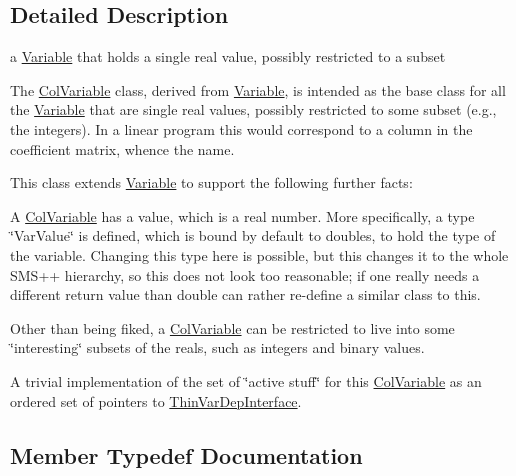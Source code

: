 \subsection{Detailed Description}
a \mbox{\hyperlink{class_s_m_spp__di__unipi__it_1_1_variable}{Variable}} that holds a single real value, possibly restricted to a subset 

The \mbox{\hyperlink{class_s_m_spp__di__unipi__it_1_1_col_variable}{Col\+Variable}} class, derived from \mbox{\hyperlink{class_s_m_spp__di__unipi__it_1_1_variable}{Variable}}, is intended as the base class for all the \mbox{\hyperlink{class_s_m_spp__di__unipi__it_1_1_variable}{Variable}} that are single real values, possibly restricted to some subset (e.\+g., the integers). In a linear program this would correspond to a column in the coefficient matrix, whence the name.

This class extends \mbox{\hyperlink{class_s_m_spp__di__unipi__it_1_1_variable}{Variable}} to support the following further facts\+:


\begin{DoxyItemize}
\item A \mbox{\hyperlink{class_s_m_spp__di__unipi__it_1_1_col_variable}{Col\+Variable}} has a value, which is a real number. More specifically, a type \char`\"{}\+Var\+Value\char`\"{} is defined, which is bound by default to doubles, to hold the type of the variable. Changing this type here is possible, but this changes it to the whole S\+M\+S++ hierarchy, so this does not look too reasonable; if one really needs a different return value than double can rather re-\/define a similar class to this.
\item Other than being fiked, a \mbox{\hyperlink{class_s_m_spp__di__unipi__it_1_1_col_variable}{Col\+Variable}} can be restricted to live into some \char`\"{}interesting\char`\"{} subsets of the reals, such as integers and binary values.
\end{DoxyItemize}

A trivial implementation of the set of \char`\"{}active stuff\char`\"{} for this \mbox{\hyperlink{class_s_m_spp__di__unipi__it_1_1_col_variable}{Col\+Variable}} as an ordered set of pointers to \mbox{\hyperlink{class_s_m_spp__di__unipi__it_1_1_thin_var_dep_interface}{Thin\+Var\+Dep\+Interface}}. 

\subsection{Member Typedef Documentation}
\mbox{\label{class_s_m_spp__di__unipi__it_1_1_col_variable_a5f7c601f4a24317327fbd91b9c7cd951}} 

